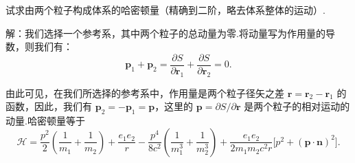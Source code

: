 \begin{xiti}
\quad 试求由两个粒子构成体系的哈密顿量（精确到二阶，略去体系整体的运动）.

解：我们选择一个参考系，其中两个粒子的总动量为零.将动量写为作用量的导数，则我们有：
\begin{equation*}
  \boldsymbol{p}_1+\boldsymbol{p}_2
  =\frac{\partial S}{\partial\boldsymbol{r}_1}
  +\frac{\partial S}{\partial\boldsymbol{r}_2}=0.
\end{equation*}

由此可见，在我们所选择的参考系中，作用量是两个粒子径矢之差
$\boldsymbol{r}=\boldsymbol{r}_2-\boldsymbol{r}_1$ 的函数，因此，我们有
$\boldsymbol{p}_2=-\boldsymbol{p}_1=\boldsymbol{p}$，这里的
$\boldsymbol{p}=\partial S/\partial\boldsymbol{r}$ 是两个粒子的相对运动的动量.哈密顿量等于
\begin{equation*}
  \mathcal{H}=\frac{p^2}{2}\left(\frac{1}{m_1}+\frac{1}{m_2}\right)
  +\frac{e_1e_2}{r}
  -\frac{p^4}{8c^2}\left(\frac{1}{m_1^3}+\frac{1}{m_2^3}\right)
  +\frac{e_1e_2}{2m_1m_2c^2r}\bigl[p^2+(\boldsymbol{p}\cdot\boldsymbol{n})^2\bigr].
\end{equation*}

\end{xiti}
